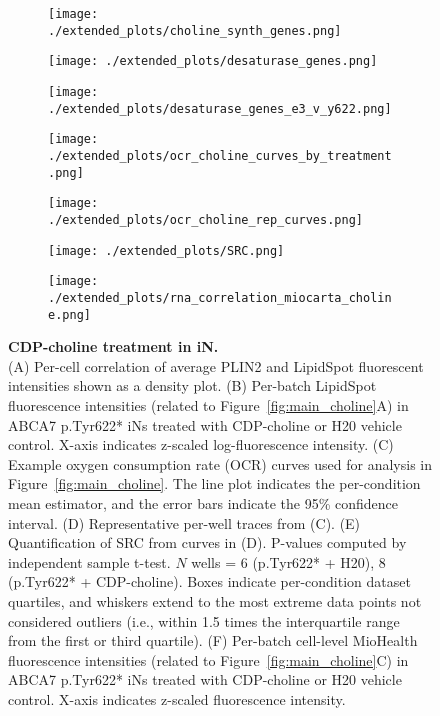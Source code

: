 \begin{figure}[ht]
    \begin{subfigure}[t]{.3\textwidth}
        \caption{}
        \texttt{[image: ./extended\_plots/choline\_synth\_genes.png]}        
    \end{subfigure}
    \begin{subfigure}[t]{.3\textwidth}
        \caption{}
        \texttt{[image: ./extended\_plots/desaturase\_genes.png]}        
    \end{subfigure}
    \begin{subfigure}[t]{.3\textwidth}
        \caption{}
        \texttt{[image: ./extended\_plots/desaturase\_genes\_e3\_v\_y622.png]}        
    \end{subfigure}
    \begin{subfigure}[t]{.3\textwidth}
        \caption{}
        \texttt{[image: ./extended\_plots/ocr\_choline\_curves\_by\_treatment.png]}        
    \end{subfigure}
    \begin{subfigure}[t]{.3\textwidth}
        \caption{}
        \texttt{[image: ./extended\_plots/ocr\_choline\_rep\_curves.png]}        
    \end{subfigure}
    \begin{subfigure}[t]{.3\textwidth}
        \caption{}
        \texttt{[image: ./extended\_plots/SRC.png]}        
    \end{subfigure}
    \begin{subfigure}[t]{.3\textwidth}
        \caption{}
        \texttt{[image: ./extended\_plots/rna\_correlation\_miocarta\_choline.png]}        
    \end{subfigure}
    \caption{
         \textbf{CDP-choline treatment in iN.}\\[1ex]
         (A) Per-cell correlation of average PLIN2 and LipidSpot fluorescent intensities shown as a density plot. 
         (B) Per-batch LipidSpot fluorescence intensities (related to Figure~\ref{fig:main_choline}A) in ABCA7 p.Tyr622* iNs treated with CDP-choline or H20 vehicle control. X-axis indicates z-scaled log-fluorescence intensity. 
         (C) Example oxygen consumption rate (OCR) curves used for analysis in Figure~\ref{fig:main_choline}. The line plot indicates the per-condition mean estimator, and the error bars indicate the 95\% confidence interval. 
         (D) Representative per-well traces from (C). 
         (E) Quantification of SRC from curves in (D). P-values computed by independent sample t-test. $N$ wells = 6 (p.Tyr622* + H20), 8 (p.Tyr622* + CDP-choline). Boxes indicate per-condition dataset quartiles, and whiskers extend to the most extreme data points not considered outliers (i.e., within 1.5 times the interquartile range from the first or third quartile). 
         (F) Per-batch cell-level MioHealth fluorescence intensities (related to Figure~\ref{fig:main_choline}C) in ABCA7 p.Tyr622* iNs treated with CDP-choline or H20 vehicle control. X-axis indicates z-scaled fluorescence intensity.
     }
     \label{fig:lipid_mitochondrial_effects_CDP_choline}
 \end{figure}